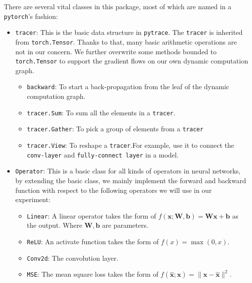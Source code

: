 \documentclass[12pt]{article}
\begin{document}
There are several vital classes in this package, most of which are named in a \texttt{pytorch}'s fashion:
\begin{itemize}
    \item \texttt{tracer}: This is the basic data structure in \texttt{pytrace}. 
    The \texttt{tracer} is inherited from \texttt{torch.Tensor}. Thanks to that, many basic arithmetic operations are not in our concern. We further overwrite some methods bounded to \texttt{torch.Tensor} to support the gradient flows on our own dynamic computation graph.
    \begin{itemize}
        \item \texttt{backward}: To start a back-propagation from the leaf of the dynamic computation graph.
        \item \texttt{tracer.Sum}: To sum all the elements in a \texttt{tracer}.
        \item \texttt{tracer.Gather}: To pick a group of elements from a \texttt{tracer}
        \item \texttt{tracer.View}: To reshape a \texttt{tracer}.For example, use it to connect the \texttt{conv-layer} and
        \texttt{fully-connect layer} in a model.
    \end{itemize}
    \item \texttt{Operator}: This is a basic class for all kinds of operators in neural networks, by extending the basic class, we mainly implement the forward and backward function with respect to the following operators we will use in our experiment:
    \begin{itemize}
        \item \texttt{Linear}: A linear operator takes the form of $f(\mathbf{x}; \mathbf{W, b}) = \mathbf{Wx+b}$ as the output. Where $\mathbf{W, b}$ are parameters.
        \item \texttt{ReLU}: An activate function takes the form of $f(x) = \max(0, x)$.
        \item \texttt{Conv2d}: The convolution layer.
        \item \texttt{MSE}: The mean square loss takes the form of $f(\hat{\mathbf{x}}; \mathbf{x}) = \|\mathbf{x} - \hat{\mathbf{x}}\|^2$.
    \end{itemize}
    

\end{itemize}
\end{document}
